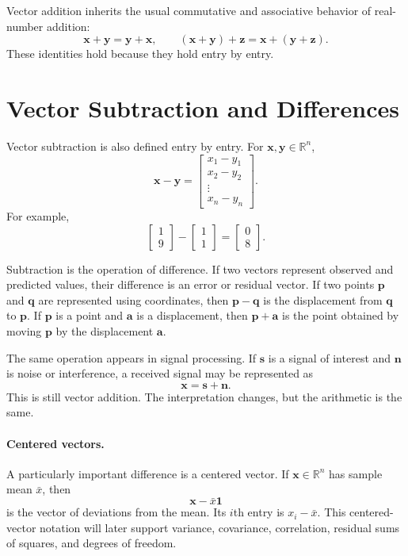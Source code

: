 Vector addition inherits the usual commutative and associative behavior of real-number addition:
\[
\mathbf{x}+\mathbf{y}=\mathbf{y}+\mathbf{x},
\qquad
(\mathbf{x}+\mathbf{y})+\mathbf{z}=\mathbf{x}+(\mathbf{y}+\mathbf{z}).
\]
These identities hold because they hold entry by entry.

\section{Vector Subtraction and Differences}
\label{mf:vector-subtraction}

Vector subtraction is also defined entry by entry. For \(\mathbf{x},\mathbf{y}\in\mathbb{R}^n\),
\[
\mathbf{x}-\mathbf{y}
=
\begin{bmatrix}
x_1-y_1\\
x_2-y_2\\
\vdots\\
x_n-y_n
\end{bmatrix}.
\]
For example,
\[
\begin{bmatrix}1\\9\end{bmatrix}
-
\begin{bmatrix}1\\1\end{bmatrix}
=
\begin{bmatrix}0\\8\end{bmatrix}.
\]

Subtraction is the operation of difference. If two vectors represent observed and predicted values, their difference is an error or residual vector. If two points \(\mathbf{p}\) and \(\mathbf{q}\) are represented using coordinates, then \(\mathbf{p}-\mathbf{q}\) is the displacement from \(\mathbf{q}\) to \(\mathbf{p}\). If \(\mathbf{p}\) is a point and \(\mathbf{a}\) is a displacement, then \(\mathbf{p}+\mathbf{a}\) is the point obtained by moving \(\mathbf{p}\) by the displacement \(\mathbf{a}\).

The same operation appears in signal processing. If \(\mathbf{s}\) is a signal of interest and \(\mathbf{n}\) is noise or interference, a received signal may be represented as
\[
\mathbf{x}=\mathbf{s}+\mathbf{n}.
\]
This is still vector addition. The interpretation changes, but the arithmetic is the same.

\paragraph{Centered vectors.}
\label{mf:centered-vectors}
A particularly important difference is a centered vector. If \(\mathbf{x}\in\mathbb{R}^n\) has sample mean \(\bar{x}\), then
\[
\mathbf{x}-\bar{x}\mathbf{1}
\]
is the vector of deviations from the mean. Its \(i\)th entry is \(x_i-\bar{x}\). This centered-vector notation will later support variance, covariance, correlation, residual sums of squares, and degrees of freedom.

